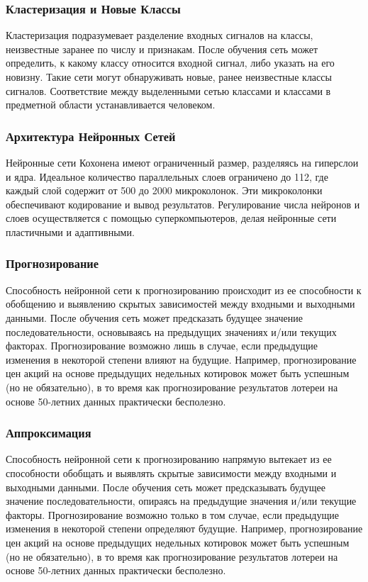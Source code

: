 \subsubsection{Кластеризация и Новые Классы}
Кластеризация подразумевает разделение входных сигналов на классы, неизвестные заранее по числу и признакам. После обучения сеть может определить, к какому классу относится входной сигнал, либо указать на его новизну. Такие сети могут обнаруживать новые, ранее неизвестные классы сигналов. Соответствие между выделенными сетью классами и классами в предметной области устанавливается человеком.

\subsubsection{Архитектура Нейронных Сетей}
Нейронные сети Кохонена имеют ограниченный размер, разделяясь на гиперслои и ядра. Идеальное количество параллельных слоев ограничено до 112, где каждый слой содержит от 500 до 2000 микроколонок. Эти микроколонки обеспечивают кодирование и вывод результатов. Регулирование числа нейронов и слоев осуществляется с помощью суперкомпьютеров, делая нейронные сети пластичными и адаптивными.

\subsubsection{Прогнозирование}
Способность нейронной сети к прогнозированию происходит из ее способности к обобщению и выявлению скрытых зависимостей между входными и выходными данными. После обучения сеть может предсказать будущее значение последовательности, основываясь на предыдущих значениях и/или текущих факторах. Прогнозирование возможно лишь в случае, если предыдущие изменения в некоторой степени влияют на будущие. Например, прогнозирование цен акций на основе предыдущих недельных котировок может быть успешным (но не обязательно), в то время как прогнозирование результатов лотереи на основе 50-летних данных практически бесполезно.

\subsubsection{Аппроксимация}
Способность нейронной сети к прогнозированию напрямую вытекает из ее способности обобщать и выявлять скрытые зависимости между входными и выходными данными. После обучения сеть может предсказывать будущее значение последовательности, опираясь на предыдущие значения и/или текущие факторы. Прогнозирование возможно только в том случае, если предыдущие изменения в некоторой степени определяют будущие. Например, прогнозирование цен акций на основе предыдущих недельных котировок может быть успешным (но не обязательно), в то время как прогнозирование результатов лотереи на основе 50-летних данных практически бесполезно.

